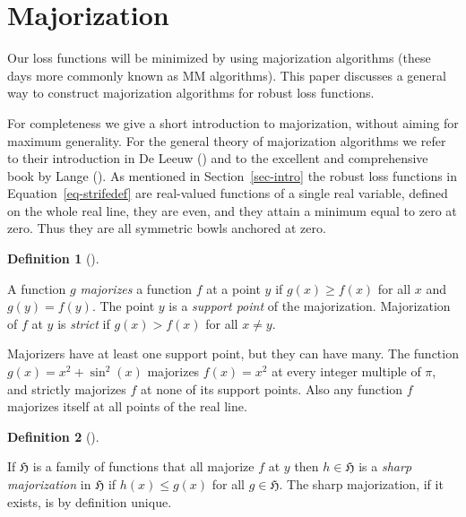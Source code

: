 \documentclass[
  12pt,
  letterpaper,
  DIV=11,
  numbers=noendperiod]{scrartcl}
\newcommand{\sectionbreak}{\pagebreak}
\theoremstyle{plain}
\theoremstyle{plain}
\theoremstyle{plain}
\theoremstyle{definition}
\newtheorem{definition}{Definition}[section]
\theoremstyle{definition}
\theoremstyle{remark}
\begin{document}
\sectionbreak

\section{Majorization}\label{sec-major}

Our loss functions will be minimized by using majorization algorithms
(these days more commonly known as MM algorithms). This paper discusses
a general way to construct majorization algorithms for robust loss
functions.

For completeness we give a short introduction to majorization, without
aiming for maximum generality. For the general theory of majorization
algorithms we refer to their introduction in De Leeuw
() and to the excellent and
comprehensive book by Lange (). As
mentioned in Section~\ref{sec-intro} the robust loss functions in
Equation~\ref{eq-strifedef} are real-valued functions of a single real
variable, defined on the whole real line, they are even, and they attain
a minimum equal to zero at zero. Thus they are all symmetric bowls
anchored at zero.

\begin{definition}[]\protect\hypertarget{def-majorize}{}\label{def-majorize}

A function \(g\) \emph{majorizes} a function \(f\) at a point \(y\) if
\(g(x)\geq f(x)\) for all \(x\) and \(g(y)=f(y)\). The point \(y\) is a
\emph{support point} of the majorization. Majorization of \(f\) at \(y\)
is \emph{strict} if \(g(x)>f(x)\) for all \(x\not= y\).

\end{definition}

Majorizers have at least one support point, but they can have many. The
function \(g(x)=x^2+\sin^2(x)\) majorizes \(f(x)=x^2\) at every integer
multiple of \(\pi\), and strictly majorizes \(f\) at none of its support
points. Also any function \(f\) majorizes itself at all points of the
real line.

\begin{definition}[]\protect\hypertarget{def-sharp}{}\label{def-sharp}

If \(\mathfrak{H}\) is a family of functions that all majorize \(f\) at
\(y\) then \(h\in\mathfrak{H}\) is a \emph{sharp majorization} in
\(\mathfrak{H}\) if \(h(x)\leq g(x)\) for all \(g\in\mathfrak{H}\). The
sharp majorization, if it exists, is by definition unique.

\end{definition}
\end{document}
